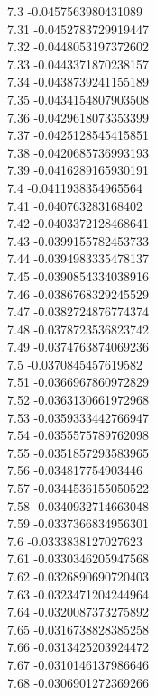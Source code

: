 {7.3	-0.0457563980431089\\
7.31	-0.0452783729919447\\
7.32	-0.0448053197372602\\
7.33	-0.0443371870238157\\
7.34	-0.0438739241155189\\
7.35	-0.0434154807903508\\
7.36	-0.0429618073353399\\
7.37	-0.0425128545415851\\
7.38	-0.0420685736993193\\
7.39	-0.0416289165930191\\
7.4	-0.0411938354965564\\
7.41	-0.040763283168402\\
7.42	-0.0403372128468641\\
7.43	-0.0399155782453733\\
7.44	-0.0394983335478137\\
7.45	-0.0390854334038916\\
7.46	-0.0386768329245529\\
7.47	-0.0382724876774374\\
7.48	-0.0378723536823742\\
7.49	-0.0374763874069236\\
7.5	-0.0370845457619582\\
7.51	-0.0366967860972829\\
7.52	-0.0363130661972968\\
7.53	-0.0359333442766947\\
7.54	-0.0355575789762098\\
7.55	-0.0351857293583965\\
7.56	-0.034817754903446\\
7.57	-0.0344536155050522\\
7.58	-0.0340932714663048\\
7.59	-0.0337366834956301\\
7.6	-0.0333838127027623\\
7.61	-0.0330346205947568\\
7.62	-0.0326890690720403\\
7.63	-0.0323471204244964\\
7.64	-0.0320087373275892\\
7.65	-0.0316738828385258\\
7.66	-0.0313425203924472\\
7.67	-0.0310146137986646\\
7.68	-0.0306901272369266\\
}
